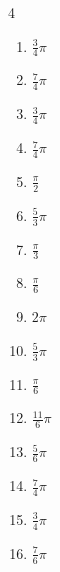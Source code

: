 \begin{multicols}{4}
\begin{enumerate}
  \item $\displaystyle \frac{3}{4}\pi$

  \item $\displaystyle \frac{7}{4}\pi$

  \item $\displaystyle \frac{3}{4}\pi$

  \item $\displaystyle \frac{7}{4}\pi$

  \item $\displaystyle \frac{\pi}{2}$

  \item $\displaystyle \frac{5}{3}\pi$

  \item $\displaystyle \frac{\pi}{3}$

  \item $\displaystyle \frac{\pi}{6}$

  \item $\displaystyle 2\pi$

  \item $\displaystyle \frac{5}{3}\pi$

  \item $\displaystyle \frac{\pi}{6}$

  \item $\displaystyle \frac{11}{6}\pi$

  \item $\displaystyle \frac{5}{6}\pi$

  \item $\displaystyle \frac{7}{4}\pi$

  \item $\displaystyle \frac{3}{4}\pi$

  \item $\displaystyle \frac{7}{6}\pi$


\end{enumerate}
\end{multicols}
